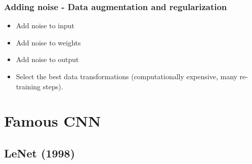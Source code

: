 \begin{frame}
	\frametitle{Adding noise - Data augmentation and regularization}
	

	\begin{itemize}
		\item Add noise to input 
		
		\smallskip 
		
		
		\smallskip
		
		
		\medskip 
		
		\item Add noise to weights
		
		\smallskip
		
		
		\smallskip
		
		
		\medskip 
		
		\item Add noise to output 
		
		\smallskip
		
		
		\medskip 
		
		\item Select the best data transformations (computationally expensive, many re-training steps). 
		
		\smallskip
		
	\end{itemize}
	
\end{frame}




\section{Famous CNN}

\subsection{LeNet (1998)}

